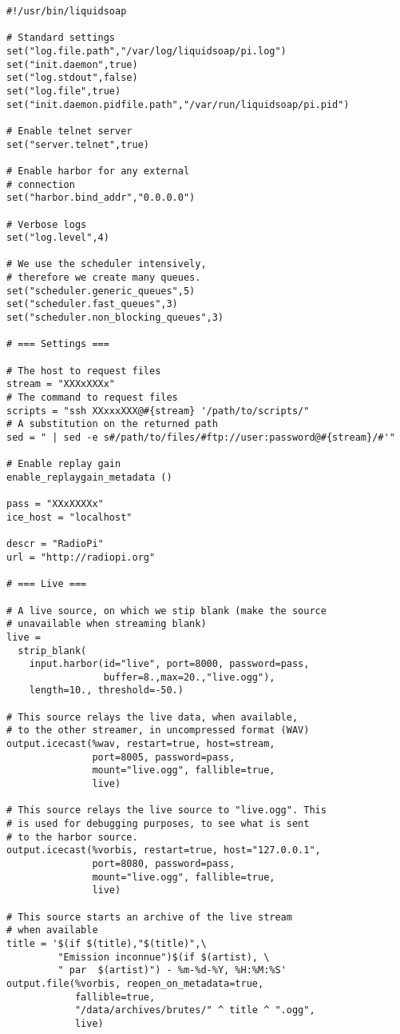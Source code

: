 \begin{verbatim}
#!/usr/bin/liquidsoap

# Standard settings
set("log.file.path","/var/log/liquidsoap/pi.log")
set("init.daemon",true)
set("log.stdout",false)
set("log.file",true)
set("init.daemon.pidfile.path","/var/run/liquidsoap/pi.pid")

# Enable telnet server
set("server.telnet",true)

# Enable harbor for any external
# connection
set("harbor.bind_addr","0.0.0.0")

# Verbose logs
set("log.level",4)

# We use the scheduler intensively,
# therefore we create many queues.
set("scheduler.generic_queues",5)
set("scheduler.fast_queues",3)
set("scheduler.non_blocking_queues",3)

# === Settings ===

# The host to request files
stream = "XXXxXXXx"
# The command to request files
scripts = "ssh XXxxxXXX@#{stream} '/path/to/scripts/"
# A substitution on the returned path
sed = " | sed -e s#/path/to/files/#ftp://user:password@#{stream}/#'"

# Enable replay gain
enable_replaygain_metadata ()

pass = "XXxXXXXx"
ice_host = "localhost"

descr = "RadioPi"
url = "http://radiopi.org"

# === Live ===

# A live source, on which we stip blank (make the source
# unavailable when streaming blank)
live = 
  strip_blank(
    input.harbor(id="live", port=8000, password=pass,
                 buffer=8.,max=20.,"live.ogg"),
    length=10., threshold=-50.)

# This source relays the live data, when available,
# to the other streamer, in uncompressed format (WAV)
output.icecast(%wav, restart=true, host=stream,
               port=8005, password=pass,
               mount="live.ogg", fallible=true,
               live)

# This source relays the live source to "live.ogg". This 
# is used for debugging purposes, to see what is sent
# to the harbor source.
output.icecast(%vorbis, restart=true, host="127.0.0.1",
               port=8080, password=pass, 
               mount="live.ogg", fallible=true,
               live)

# This source starts an archive of the live stream
# when available
title = '$(if $(title),"$(title)",\
         "Emission inconnue")$(if $(artist), \
         " par  $(artist)") - %m-%d-%Y, %H:%M:%S'
output.file(%vorbis, reopen_on_metadata=true,
            fallible=true,
            "/data/archives/brutes/" ^ title ^ ".ogg",
            live)


\end{verbatim}
